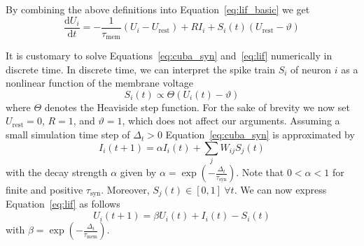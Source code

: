\documentclass[journal,onecolumn,11pt]{IEEEtran}
\begin{document}
By combining the above definitions into Equation~\eqref{eq:lif_basic} we get 
\begin{equation} 
    \frac{\mathrm{d}U_i}{\mathrm{d}t} = -\frac{1}{\tau_\mathrm{mem}}(U_i-U_\mathrm{rest}) + RI_i + S_i(t)(U_\mathrm{rest}-\vartheta)
    \label{eq:lif}
\end{equation}

It is customary to solve Equations~\eqref{eq:cuba_syn} and~\eqref{eq:lif} numerically in discrete time.
In discrete time, we can interpret the spike train $S_i$ of neuron $i$ as a nonlinear function of the membrane voltage
\begin{equation}
    S_i(t)\propto\Theta(U_i(t)-\vartheta)
    \label{eq:spike}
\end{equation}
where $\Theta$ denotes the Heaviside step function.  
For the sake of brevity we now set $U_\mathrm{rest}=0$, $R=1$, and $\vartheta=1$, which does not affect our arguments.
Assuming a small simulation time step of $\Delta_t>0$ Equation~\eqref{eq:cuba_syn} is approximated by
\begin{equation}
  I_i(t+1) = \alpha I_i(t) + \sum_j W_{ij} S_j(t)
    \label{eq:syn_discrete_time}
\end{equation}
with the decay strength $\alpha$ given by $\alpha=\exp\left(-\frac{\Delta_t}{\tau_\mathrm{syn}} \right)$.  
Note that $0<\alpha<1$ for finite and positive $\tau_\mathrm{syn}$.  
Moreover, $S_j(t) \in [0,1]~ \forall t$.
We can now express Equation~\eqref{eq:lif} as follows 
\begin{equation}
    U_i(t+1) = \beta U_i(t) + I_i(t) -S_i(t)
    \label{eq:mem_discrete_time}
\end{equation}
with $\beta=\exp\left(-\frac{\Delta_t}{\tau_\mathrm{mem}}\right)$.
\end{document}
